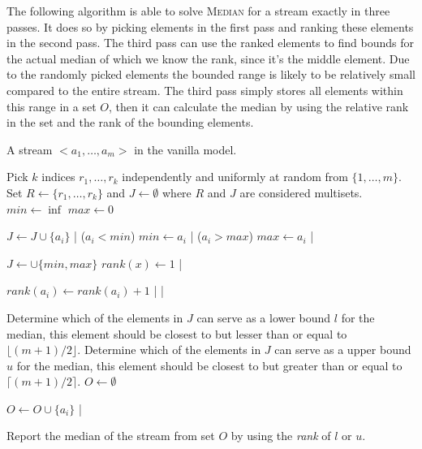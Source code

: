 The following algorithm is able to solve \textsc{Median} for a stream exactly in three passes.
It does so by picking elements in the first pass and ranking these elements in the second pass.
The third pass can use the ranked elements to find bounds for the actual median of which we know the rank, since it's the middle element.
Due to the randomly picked elements the bounded range is likely to be relatively small compared to the entire stream.
The third pass simply stores all elements within this range in a set $O$, then it can calculate the median by using the relative rank in the set and the rank of the bounding elements.

\begin{sourcecode}
A stream $<a_1, \ldots , a_m>$ in the vanilla model.
\silend

Pick $k$ indices $r_1, \ldots , r_k$ independently and uniformly at random from $\{1, \ldots , m\}$.
Set $R \leftarrow \{r_1, \ldots , r_k\}$ and $J \leftarrow \emptyset$ where $R$ and $J$ are considered multisets.
$\textit{min} \leftarrow \inf$
$\textit{max} \leftarrow 0$
\silend

	$J \leftarrow J \cup \{a_i\}$
|
\qif($a_i < \textit{min}$)
	$\textit{min} \leftarrow a_i$
|
\qif($a_i > \textit{max}$)
	$\textit{max} \leftarrow a_i$
|
\silend

$J \leftarrow \cup \{min, max\}$
	$\textit{rank}(x) \leftarrow 1$
|
\silend

		$\textit{rank}(a_i) \leftarrow \textit{rank}(a_i) + 1$
	|
|
\silend

Determine which of the elements in $J$ can serve as a lower bound $l$ for the median, this element should be closest to but lesser than or equal to $\lfloor (m+1)/2 \rfloor$.
Determine which of the elements in $J$ can serve as a upper bound $u$ for the median, this element should be closest to but greater than or equal to $\lceil (m+1)/2 \rceil$.
$O \leftarrow \emptyset$
\silend

	$O \leftarrow O \cup \{a_i\}$
|
\silend

Report the median of the stream from set $O$ by using the \textit{rank} of $l$ or $u$.
\qend
\end{sourcecode}

